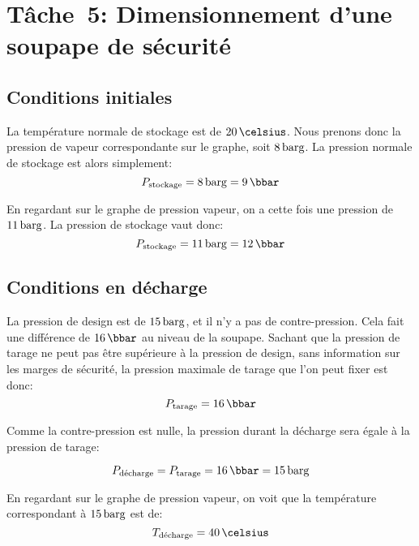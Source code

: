 \chapter{Tâche~5: Dimensionnement d'une soupape de sécurité}

\section{Conditions initiales}
La température normale de stockage est de $20\,\celsius$.
Nous prenons donc la pression de vapeur
correspondante sur le graphe, soit $8\,\mathrm{barg}$.
La pression normale de stockage est alors simplement:
\begin{equation*}
    P\ind{stockage} = 8\,\barg = 9\,\bbar
\end{equation*}

En regardant sur le graphe de pression vapeur,
on a cette fois une pression de $11\,\mathrm{barg}$.
La pression de stockage vaut donc:
\begin{equation*}
    P\ind{stockage} = 11\,\barg = 12\,\bbar
\end{equation*}

\section{Conditions en décharge}
La pression de design est de $15\,\mathrm{barg}$,
et il n'y a pas de contre-pression.
Cela fait une différence de $16\,\bbar$ au niveau de la soupape.
Sachant que la pression de tarage ne peut pas être supérieure
à la pression de design, sans information sur les marges de sécurité,
la pression maximale de tarage que l'on peut fixer est donc:
\begin{equation*}
    P\ind{tarage} = 16\,\bbar
\end{equation*}

Comme la contre-pression est nulle,
la pression durant la décharge sera égale à la pression de tarage:

\begin{equation*}
    P\ind{décharge} = P\ind{tarage} = 16\,\bbar = 15\,\barg
\end{equation*}

En regardant sur le graphe de pression vapeur, on voit que la température
correspondant à $15\,\mathrm{barg}$ est de:
\begin{equation*}
    T\ind{décharge} = 40\,\celsius
\end{equation*}

